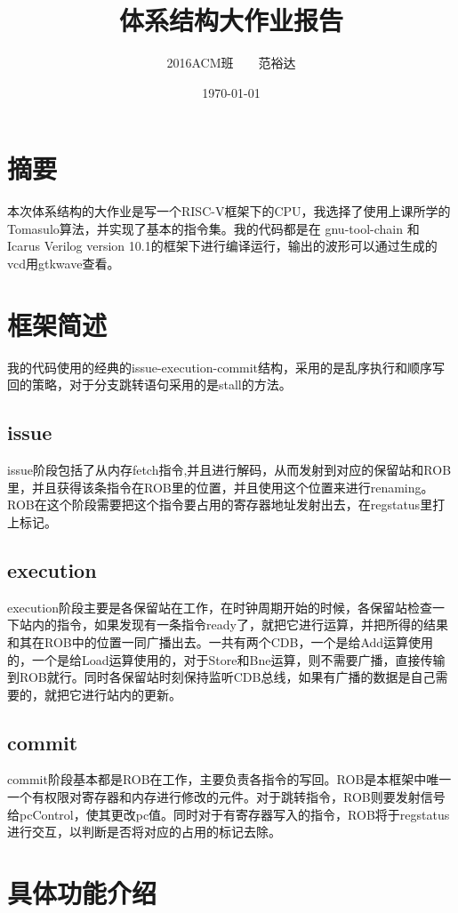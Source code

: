 \documentclass{article}
\title{体系结构大作业报告}
\author{2016ACM班~~~~范裕达}
\date{\today}
\begin{document}
\maketitle

\section{摘要}
本次体系结构的大作业是写一个RISC-V框架下的CPU，我选择了使用上课所学的Tomasulo算法，并实现了基本的指令集。我的代码都是在 gnu-tool-chain 和 Icarus Verilog version 10.1的框架下进行编译运行，输出的波形可以通过生成的vcd用gtkwave查看。

\section{框架简述}
我的代码使用的经典的issue-execution-commit结构，采用的是乱序执行和顺序写回的策略，对于分支跳转语句采用的是stall的方法。

\subsection{issue}
	issue阶段包括了从内存fetch指令,并且进行解码，从而发射到对应的保留站和ROB里，并且获得该条指令在ROB里的位置，并且使用这个位置来进行renaming。ROB在这个阶段需要把这个指令要占用的寄存器地址发射出去，在regstatus里打上标记。

\subsection{execution}
	execution阶段主要是各保留站在工作，在时钟周期开始的时候，各保留站检查一下站内的指令，如果发现有一条指令ready了，就把它进行运算，并把所得的结果和其在ROB中的位置一同广播出去。一共有两个CDB，一个是给Add运算使用的，一个是给Load运算使用的，对于Store和Bne运算，则不需要广播，直接传输到ROB就行。同时各保留站时刻保持监听CDB总线，如果有广播的数据是自己需要的，就把它进行站内的更新。

\subsection{commit}
	commit阶段基本都是ROB在工作，主要负责各指令的写回。ROB是本框架中唯一一个有权限对寄存器和内存进行修改的元件。对于跳转指令，ROB则要发射信号给pcControl，使其更改pc值。同时对于有寄存器写入的指令，ROB将于regstatus进行交互，以判断是否将对应的占用的标记去除。
	
\section{具体功能介绍}
\end{document}
